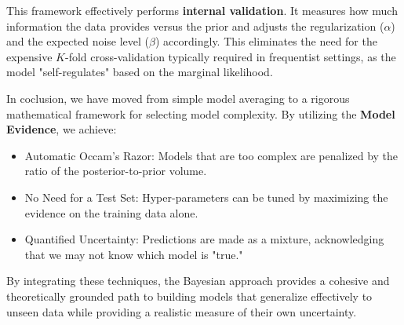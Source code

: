 \begin{myexample}
This framework effectively performs \textbf{internal validation}. It measures how much information the data provides versus the prior and adjusts the regularization ($\alpha$) and the expected noise level ($\beta$) accordingly. This eliminates the need for the expensive $K$-fold cross-validation typically required in frequentist settings, as the model "self-regulates" based on the marginal likelihood.

\medskip
In coclusion, we have moved from simple model averaging to a rigorous mathematical framework for selecting model complexity. By utilizing the \textbf{Model Evidence}, we achieve:
\begin{itemize}
    \item Automatic Occam's Razor: Models that are too complex are penalized by the ratio of the posterior-to-prior volume.
    \item No Need for a Test Set: Hyper-parameters can be tuned by maximizing the evidence on the training data alone.
    \item Quantified Uncertainty: Predictions are made as a mixture, acknowledging that we may not know which model is "true."
\end{itemize}

By integrating these techniques, the Bayesian approach provides a cohesive and theoretically grounded path to building models that generalize effectively to unseen data while providing a realistic measure of their own uncertainty.
	
\end{myexample}

%
%